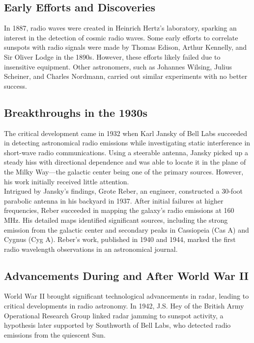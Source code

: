 \subsection{Early Efforts and Discoveries}

In 1887, radio waves were created in Heinrich Hertz's laboratory, sparking an interest in the detection of cosmic radio waves. Some early efforts to correlate sunspots with radio signals were made by Thomas Edison, Arthur Kennelly, and Sir Oliver Lodge in the 1890s. However, these efforts likely failed due to insensitive equipment. Other astronomers, such as Johannes Wilsing, Julius Scheiner, and Charles Nordmann, carried out similar experiments with no better success.

\subsection{Breakthroughs in the 1930s}

The critical development came in 1932 when Karl Jansky of Bell Labs succeeded in detecting astronomical radio emissions while investigating static interference in short-wave radio communications. Using a steerable antenna, Jansky picked up a steady hiss with directional dependence and was able to locate it in the plane of the Milky Way—the galactic center being one of the primary sources. However, his work initially received little attention. \\

Intrigued by Jansky's findings, Grote Reber, an engineer, constructed a 30-foot parabolic antenna in his backyard in 1937. After initial failures at higher frequencies, Reber succeeded in mapping the galaxy's radio emissions at 160 MHz. His detailed maps identified significant sources, including the strong emission from the galactic center and secondary peaks in Cassiopeia (Cas A) and Cygnus (Cyg A). Reber's work, published in 1940 and 1944, marked the first radio wavelength observations in an astronomical journal.

\subsection{Advancements During and After World War II}

World War II brought significant technological advancements in radar, leading to critical developments in radio astronomy. In 1942, J.S. Hey of the British Army Operational Research Group linked radar jamming to sunspot activity, a hypothesis later supported by Southworth of Bell Labs, who detected radio emissions from the quiescent Sun. \\

